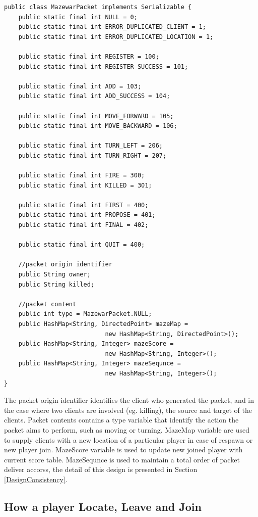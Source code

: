 {
\singlespacing
\begin{lstlisting}[caption = {[MazewarPacket.java]Structure of packets exchanged between players}, label = CodeMazewarPacket]
public class MazewarPacket implements Serializable {
    public static final int NULL = 0;
    public static final int ERROR_DUPLICATED_CLIENT = 1;
    public static final int ERROR_DUPLICATED_LOCATION = 1;

    public static final int REGISTER = 100;
    public static final int REGISTER_SUCCESS = 101;

    public static final int ADD = 103;
    public static final int ADD_SUCCESS = 104;

    public static final int MOVE_FORWARD = 105;
    public static final int MOVE_BACKWARD = 106;

    public static final int TURN_LEFT = 206;
    public static final int TURN_RIGHT = 207;

    public static final int FIRE = 300;
    public static final int KILLED = 301;

    public static final int FIRST = 400;
    public static final int PROPOSE = 401;
    public static final int FINAL = 402;

    public static final int QUIT = 400;

    //packet origin identifier
    public String owner;
    public String killed;

	//packet content
    public int type = MazewarPacket.NULL;
    public HashMap<String, DirectedPoint> mazeMap = 
    						new HashMap<String, DirectedPoint>();
    public HashMap<String, Integer> mazeScore = 
    						new HashMap<String, Integer>();
    public HashMap<String, Integer> mazeSequnce = 
    						new HashMap<String, Integer>();
}
\end{lstlisting}
}

The packet origin identifier identifies the client who generated the packet, and in the case where two clients are involved (eg. killing), the source and target of the clients. Packet contents contains a type variable that identify the action the packet aims to perform, such as moving or turning. MazeMap variable are used to supply clients with a new location of a particular player in case of respawn or new player join. MazeScore variable is used to update new joined player with current score table. MazeSequnce is used to maintain a total order of packet deliver accorss, the detail of this design is presented in Section \ref{DesignConsistency}.

\subsection{How a player Locate, Leave and Join}\label{DesignGameFlow}

